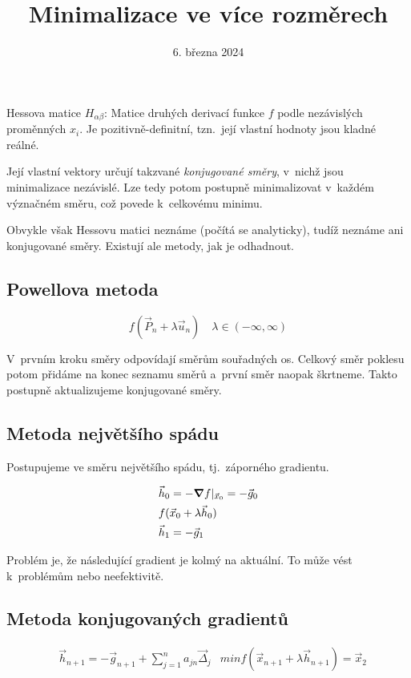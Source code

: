 \documentclass[a4paper]{article}
\title{Minimalizace ve více rozměrech}
\date{6. března 2024}
\begin{document}
Hessova matice $H_{\alpha\beta}$: Matice druhých derivací funkce $f$
podle nezávislých proměnných $x_i$.
Je pozitivně-definitní, tzn.~její vlastní hodnoty jsou kladné reálné.

Její vlastní vektory určují takzvané \emph{konjugované směry},
v~nichž jsou minimalizace nezávislé.
Lze tedy potom postupně minimalizovat v~každém význačném směru,
což povede k~celkovému minimu.

Obvykle však Hessovu matici neznáme (počítá se analyticky),
tudíž neznáme ani konjugované směry.
Existují ale metody, jak je odhadnout.

\subsection{Powellova metoda}

\begin{equation}
    f (\vec{P}_n + \lambda \vec{u}_n) \quad \lambda \in (-\infty, \infty)
\end{equation}

V prvním kroku směry odpovídají směrům souřadných os.
Celkový směr poklesu potom přidáme na konec seznamu směrů
a~první směr naopak škrtneme.
Takto postupně aktualizujeme konjugované směry.

\subsection{Metoda největšího spádu}
Postupujeme ve směru největšího spádu, tj.~záporného gradientu.

\begin{align}
    & \vec h_0 = -\grad f |_{\vec x_0} = -\vec g_0 \\
    & f(\vec x_0 + \lambda \vec h_0) \\
    & \vec h_1 = -\vec g_1
\end{align}

Problém je, že následující gradient je kolmý na aktuální.
To může vést k~problémům nebo neefektivitě.

\subsection{Metoda konjugovaných gradientů}

\begin{align}
    & \vec h_{n+1} = -\vec g_{n+1} + \sum_{j=1}^n a_{jn} \vec \Delta_j
    & min f(\vec x_{n+1} + \lambda \vec h_{n+1}) = \vec x_2
\end{align}
\end{document}
